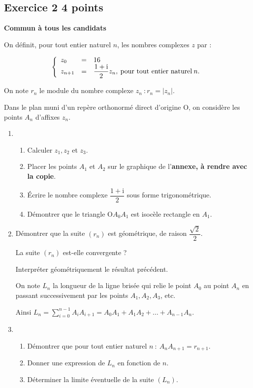 \documentclass[10pt]{article}
\begin{document}
\subsection*{Exercice 2 \hfill 4 points}

\textbf{Commun à tous les candidats}

\medskip
 
On définit, pour tout entier naturel $n$, les nombres complexes $z$ par : 

\[\left\{\begin{array}{l c l}
z_{0}&=& 16\\ 
z_{n+1}&=&\dfrac{1 + \text{i}}{2}z_{n},\: \text{pour tout entier naturel} \: n.
\end{array}\right.\]
 
On note $r_{n}$ le module du nombre complexe $z_{n}\: : r_{n} =\left|z_{n}\right|$.
 
Dans le plan muni d'un repère orthonormé direct d'origine O, on considère les points $A_{n}$ d'affixes $z_{n}$.

\medskip{}
 
\begin{enumerate}
\item 
	\begin{enumerate}
		\item Calculer $z_{1}, z_{2}$ et $z_{3}$. 
		\item Placer les points $A_{1}$ et $A_{2}$ sur le graphique de l'\textbf{annexe, à rendre avec la copie}. 
		\item Écrire le nombre complexe $\dfrac{1 + \text{i}}{2}$ sous forme trigonométrique. 
		\item Démontrer que le triangle O$A_{0}A_{1}$ est isocèle rectangle en $A_{1}$. 
	\end{enumerate}
\item Démontrer que la suite $\left(r_{n}\right)$ est géométrique, de raison $\dfrac{\sqrt{2}}{2}$.
 
La suite $\left(r_{n}\right)$ est-elle convergente ?
 
Interpréter géométriquement le résultat précédent. 

On note $L_{n}$ la longueur de la ligne brisée qui relie le point $A_{0}$ au point $A_{n}$ en passant successivement par les points $A_{1}, A_{2},  A_{3}$,  etc. 
 
Ainsi $L_{n} = \displaystyle\sum_{i=0}^{n-1} A_{i}A_{i+1} =  A_{0}A_{1} + A_{1}A_{2} + \ldots + A_{n-1}A_{n}.$
\item
	\begin{enumerate}
		\item Démontrer que pour tout entier naturel $n \::\: A_{n}A_{n+1} = r_{n+1}$. 
		\item Donner une expression de $L_{n}$ en fonction de $n$. 
		\item Déterminer la limite éventuelle de la suite $\left(L_{n}\right)$.
	\end{enumerate}
\end{enumerate}
\end{document}
